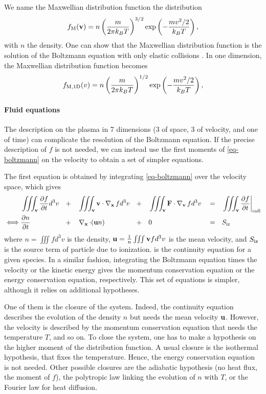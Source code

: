 We name the Maxwellian distribution function the distribution
\begin{equation} \label{eq-Maxwelliantwo}
  f_{\rm M}({\mathbf v}) = n \left( \frac{m}{2 \pi k_B T}\right)^{3/2} \exp \left( - \frac{ m v^2/2}{k_B T } \right),
\end{equation}
with $n$ the density.
One can show that the Maxwellian distribution function is the solution of the Boltzmann equation with only elastic collisions \citep{lieberman2005}.
In one dimension, the Maxwellian distribution function becomes
\begin{equation}
  f_{\rm M, 1D}(v) =  n \left(\frac{m}{2 \pi k_B T}\right)^{1/2} \exp \left( - \frac{ m v^2/2}{k_B T } \right),
\end{equation}

\paragraph{Fluid equations \\}
The description on the plasma in 7 dimensions (3 of space, 3 of velocity, and one of time) can complicate the resolution of the Boltzmann equation.
If the precise description of $f$ is not needed, we can instead use the first moments of \cref{eq-boltzmann} on the velocity to obtain a set of simpler equations.

The first equation is obtained by integrating \cref{eq-boltzmann} over the velocity space, which gives
\begin{align}
    & \iiint_{{\mathbf v}}  \frac{\partial f}{\partial t} d^3v &&+&& \iiint_{{\mathbf v}}  {\mathbf v} \cdot \operatorname{{\mathbf \nabla}}_{{\mathbf x}} f  d^3v &&+&&  \iiint_{{\mathbf v}}  {\mathbf F} \cdot  \operatorname{{\mathbf \nabla}}_{{\mathbf v}} f  d^3v && = && \iiint_{{\mathbf v}}  \frac{\partial f}{\partial t}  \bigg\vert_{\rm coll}  \nonumber  \\ 
   \iff &  \frac{\partial n}{\partial t} &&+&&  \operatorname{{\mathbf \nabla}}_{{\mathbf x}}  \cdot  ( {\mathbf u} n) &&+&& 0 &&=&& S_{\rm iz}   \label{eq-conc}
\end{align} 
where $n=\iiint f d^3v$ is the density, ${\mathbf u} = \frac{1}{n} \iiint {\mathbf v} f d^3v$ is the mean velocity, and $S_{\rm iz}$ is the source term of particle due to ionization.
 is the continuity equation for a given species.
In a similar fashion, integrating the Boltzmann equation times the velocity or the kinetic energy gives the momentum conservation equation or the energy conservation equation, respectively.
This set of equations is simpler, although it relies on additional hypotheses.

One of them is the closure of the system.
Indeed, the continuity equation describes the evolution of the density $n$ but needs the mean velocity ${\mathbf u}$.
However, the velocity is described by the momentum conservation equation that needs the temperature $T$, and so on.
To close the system, one has to make a hypothesis on the higher moment of the distribution function.
A usual closure is the isothermal hypothesis, that fixes the temperature. 
Hence, the energy conservation equation is not needed.
Other possible closures are the adiabatic hypothesis (no heat flux, the  moment of $f$), the polytropic law linking the evolution of $n$ with $T$, or the Fourier law for heat diffusion.

